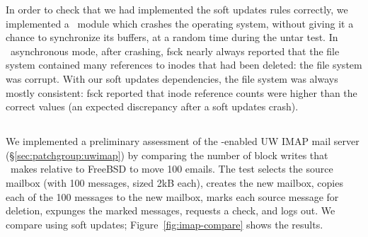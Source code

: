 In order to check that we had implemented the soft updates rules correctly, we
implemented a \Kudos\ module which crashes the operating system, without
giving it a chance to synchronize its buffers, at a random time during the
untar test.
%
In \Kudos\ asynchronous mode, after crashing, fsck nearly always reported that
the file system contained many references to inodes that had been deleted: the
file system was corrupt.
%
With our soft updates dependencies, the file system was always mostly
consistent: fsck reported that inode reference counts were higher than the
correct values (an expected discrepancy after a soft updates crash).

\subsection {\Patchgroups}



%

\label{sec:evaluation:uwimap}
We implemented a preliminary assessment of the \patchgroup-enabled UW IMAP mail server
(\S\ref{sec:patchgroup:uwimap}) by comparing the number of block writes
that \Kudos\ makes relative to FreeBSD to move 100 emails. The test
selects the source mailbox (with 100 messages, sized 2kB each),
creates the new mailbox, copies each of the 100 messages to the new
mailbox, marks each source message for deletion, expunges the marked
messages, requests a check, and logs out. We compare using soft updates;
Figure~\ref{fig:imap-compare} shows the results.


